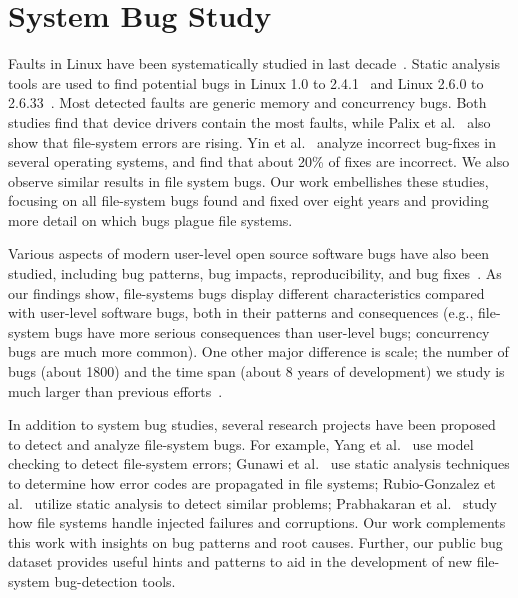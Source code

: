 \section{System Bug Study}

Faults in Linux have been systematically 
studied in last decade~\cite{ChouEtAl01-OSErrors,Palix+11-LinuxFaults}.  
Static analysis tools are used to find potential bugs in Linux 1.0 to
2.4.1~\cite{ChouEtAl01-OSErrors} and Linux 2.6.0 to
2.6.33~\cite{Palix+11-LinuxFaults}. Most detected faults are generic memory
and concurrency bugs. Both studies find that device drivers contain the most
faults, while Palix et al.~\cite{Palix+11-LinuxFaults} also show that
file-system errors are rising. Yin et al.~\cite{Yin+11-FixFix} analyze
incorrect bug-fixes in several operating systems, and find that about
20\% of fixes are incorrect.  We also observe similar results in file
system bugs.  Our work embellishes these studies, focusing on all
file-system bugs found and fixed over eight years and providing more
detail on which bugs plague file systems.  

Various aspects of modern user-level open source
software bugs have also been studied, including bug patterns, bug impacts,
reproducibility, and bug fixes~\cite{Fonseca+10-ConEffect,Li+06-HaveThingsChanged,LuEtAl08-Mistakes,Sahoo+10-Empirical,Xiong+10-Sync}.
As our findings show, file-systems bugs display different characteristics
compared with user-level software bugs, both in their patterns and
consequences (e.g., file-system bugs have more serious consequences than
user-level bugs; concurrency bugs are much more common).  One other major
difference is scale; the number of bugs (about 1800) and the time span
(about 8 years of development) we study is much larger than previous
efforts~\cite{Fonseca+10-ConEffect,Li+06-HaveThingsChanged,LuEtAl08-Mistakes,Sahoo+10-Empirical,Xiong+10-Sync}. 

In addition to system bug studies, several research projects have been
proposed to detect and analyze file-system bugs. For example, Yang et
al.~\cite{YangEtAl06-Explode,YangEtAl04-FSErrors} use model checking to detect
file-system errors; Gunawi et al.~\cite{GunawiEtAl08-EIO} use static analysis
techniques to determine how error codes are propagated in file systems;
Rubio-Gonzalez et al.~\cite{RubioGonzalez+09-PLDI} utilize static analysis to
detect similar problems; Prabhakaran et al.~\cite{PrabhakaranEtAl05-SOSP}
study how file systems handle injected failures and corruptions.  Our work
complements this work with insights on bug patterns and root causes.  Further,
our public bug dataset provides useful hints and patterns to aid in the
development of new file-system bug-detection tools. 

